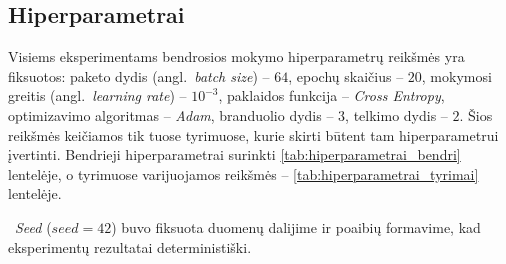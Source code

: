\subsection{Hiperparametrai}
\label{subsec:hiperparametrai}

Visiems eksperimentams bendrosios mokymo hiperparametrų reikšmės yra fiksuotos: paketo dydis (angl.~\textit{batch size}) – $64$, epochų skaičius – $20$, mokymosi greitis (angl.~\textit{learning rate}) – $10^{-3}$, paklaidos funkcija – \textit{Cross Entropy}, optimizavimo algoritmas – \textit{Adam}, branduolio dydis – $3$, telkimo dydis – $2$. Šios reikšmės keičiamos tik tuose tyrimuose, kurie skirti būtent tam hiperparametrui įvertinti. Bendrieji hiperparametrai surinkti \ref{tab:hiperparametrai_bendri} lentelėje, o tyrimuose varijuojamos reikšmės – \ref{tab:hiperparametrai_tyrimai} lentelėje.




~\textit{Seed} ($seed = 42$) buvo fiksuota duomenų dalijime ir poaibių formavime, kad eksperimentų rezultatai deterministiški.
